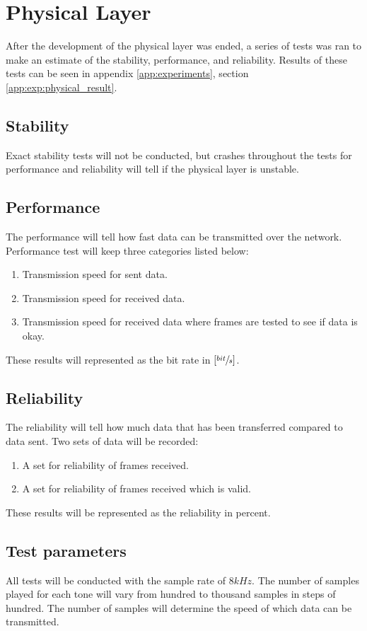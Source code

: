 \section{Physical Layer}
After the development of the physical layer was ended, a series of tests was ran to make an estimate of the stability, performance, and reliability. Results of these tests can be seen in appendix \ref{app:experiments}, section \ref{app:exp:physical_result}.

	\subsection{Stability}
	Exact stability tests will not be conducted, but crashes throughout the tests for performance and reliability will tell if the physical layer is unstable.

	\subsection{Performance}
	The performance will tell how fast data can be transmitted over the network. Performance test will keep three categories listed below:
	
	\begin{enumerate}
	\item Transmission speed for sent data.
	\item Transmission speed for received data.
	\item Transmission speed for received data where frames are tested to see if data is okay.
	\end{enumerate}
	These results will represented as the bit rate in $[\sfrac{bit}{s}]$.
	
	\subsection{Reliability}
	The reliability will tell how much data that has been transferred compared to data sent. Two sets of data will be recorded:
	
	\begin{enumerate}
	\item A set for reliability of frames received.
	\item A set for reliability of frames received which is valid.
	\end{enumerate}
	These results will be represented as the reliability in percent.
	
	\subsection{Test parameters}
	All tests will be conducted with the sample rate of $8kHz$. The number of samples played for each tone will vary from hundred to thousand samples in steps of hundred. The number of samples will determine the speed of which data can be transmitted.
	
